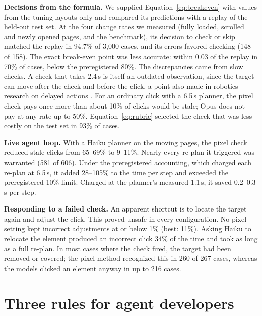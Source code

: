 \documentclass[10pt]{article}
\begin{document}
\textbf{Decisions from the formula.} We supplied Equation~\ref{eq:breakeven} with values from the tuning layouts only and compared its predictions with a replay of the held-out test set. At the four change rates we measured (fully loaded, scrolled and newly opened pages, and the benchmark), its decision to check or skip matched the replay in 94.7\% of 3,000 cases, and its errors favored checking (148 of 158). The exact break-even point was less accurate: within 0.03 of the replay in 70\% of cases, below the preregistered 80\%. The discrepancies came from slow checks. A check that takes 2.4\,s is itself an outdated observation, since the target can move after the check and before the click, a point also made in robotics research on delayed actions \citep{arli}. For an ordinary click with a 6.5\,s planner, the pixel check pays once more than about 10\% of clicks would be stale; Opus does not pay at any rate up to 50\%. Equation~\ref{eq:rubric} selected the check that was less costly on the test set in 93\% of cases.

\textbf{Live agent loop.} With a Haiku planner on the moving pages, the pixel check reduced stale clicks from 65--69\% to 9--11\%. Nearly every re-plan it triggered was warranted (581 of 606). Under the preregistered accounting, which charged each re-plan at 6.5\,s, it added 28--105\% to the time per step and exceeded the preregistered 10\% limit. Charged at the planner's measured 1.1\,s, it saved 0.2--0.3\,s per step.

\textbf{Responding to a failed check.} An apparent shortcut is to locate the target again and adjust the click. This proved unsafe in every configuration. No pixel setting kept incorrect adjustments at or below 1\% (best: 11\%). Asking Haiku to relocate the element produced an incorrect click 34\% of the time and took as long as a full re-plan. In most cases where the check fired, the target had been removed or covered; the pixel method recognized this in 260 of 267 cases, whereas the models clicked an element anyway in up to 216 cases.

\section{Three rules for agent developers}
\label{sec:rules}
\end{document}
